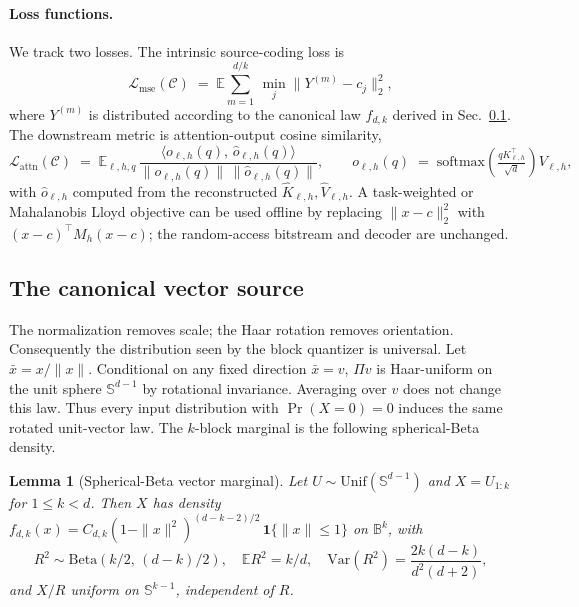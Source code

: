\documentclass{article}
\newtheorem{lemma}{Lemma}
\theoremstyle{definition}
\theoremstyle{remark}
\newcommand{\bbS}{\mathbb{S}}
\newcommand{\bbB}{\mathbb{B}}
\begin{document}
\paragraph{Loss functions.}
We track two losses.  The intrinsic source-coding loss is
\begin{equation}
\mathcal{L}_{\mathrm{mse}}(\mathcal{C})
\;=\;
\mathbb{E}\sum_{m = 1}^{d/k}\,\min_{j} \|Y^{(m)} - c_j\|_2^2,
\end{equation}
where $Y^{(m)}$ is distributed according to the canonical law
$f_{d, k}$ derived in Sec.~\ref{sec:canonical_source}.  The
downstream metric is attention-output cosine similarity,
\begin{equation}
\mathcal{L}_{\mathrm{attn}}(\mathcal{C})
\;=\;
\mathbb{E}_{\ell, h, q}\,
\frac{\langle o_{\ell, h}(q),\, \hat o_{\ell, h}(q)\rangle}
     {\|o_{\ell, h}(q)\|\, \|\hat o_{\ell, h}(q)\|},
\qquad
o_{\ell, h}(q)
\;=\;
\mathrm{softmax}\!\left(\tfrac{q K_{\ell, h}^\top}{\sqrt d}\right) V_{\ell, h},
\label{eq:lattn}
\end{equation}
with $\hat o_{\ell, h}$ computed from the reconstructed
$\hat K_{\ell, h}, \hat V_{\ell, h}$.  A task-weighted or
Mahalanobis Lloyd objective can be used offline by replacing
$\|x - c\|_2^2$ with $(x - c)^\top M_h (x - c)$; the random-access
bitstream and decoder are unchanged.

\subsection{The canonical vector source}
\label{sec:canonical_source}

The normalization removes scale; the Haar rotation removes
orientation.  Consequently the distribution seen by the block
quantizer is universal.  Let $\bar x = x / \|x\|$.  Conditional on
any fixed direction $\bar x = v$, $\Pi v$ is Haar-uniform on the
unit sphere $\bbS^{d - 1}$ by rotational invariance.  Averaging over
$v$ does not change this law.  Thus every input distribution with
$\Pr(X = 0) = 0$ induces the same rotated unit-vector law.  The
$k$-block marginal is the following spherical-Beta density.

\begin{lemma}[Spherical-Beta vector marginal]
\label{lem:sphbeta}
Let $U \sim \mathrm{Unif}(\bbS^{d - 1})$ and $X = U_{1:k}$ for
$1 \leq k < d$.  Then $X$ has density
$f_{d, k}(x) = C_{d, k}(1 - \|x\|^2)^{(d - k - 2)/2}\,\mathbf{1}\{\|x\|
\leq 1\}$ on $\bbB^k$, with
\begin{equation}
R^2 \sim \mathrm{Beta}\!\left(k/2,\,(d - k)/2\right),
\quad
\mathbb{E} R^2 = k/d,
\quad
\mathrm{Var}(R^2) = \frac{2 k(d - k)}{d^2 (d + 2)},
\label{eq:radial_law}
\end{equation}
and $X / R$ uniform on $\bbS^{k - 1}$, independent of $R$.
\end{lemma}
\end{document}
